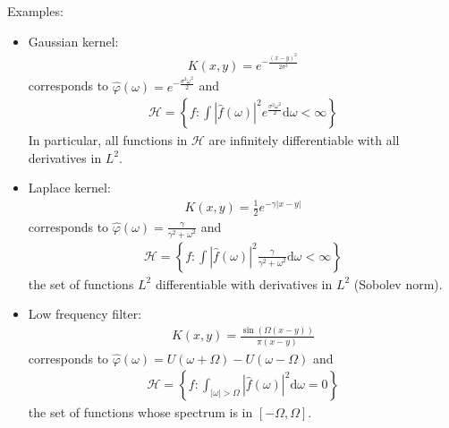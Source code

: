 \documentclass[10pt]{article}
\begin{document}
Examples:
\begin{itemize}
  \item Gaussian kernel:
  \begin{align*}
    K(x, y) = e^{-\frac{(x-y)^2}{2\sigma^2}}
  \end{align*}
  corresponds to $\hat{\varphi}(\omega) = e^{-\frac{\sigma^2\omega^2}{2}}$ and 
  \begin{align*}
    \mathcal{H}  = \left\{f: \int\left|\hat{f}(\omega)\right|^2 
    e^{\frac{\sigma^2\omega^2}{2}} \text{d}\omega < \infty \right\}
  \end{align*}
  In particular, all functions in $\mathcal{H}$ are infinitely differentiable 
  with all derivatives in $L^2$.

  \item Laplace kernel:
  \begin{align*}
    K(x, y) = \frac{1}{2}e^{-\gamma|x-y|}
  \end{align*}
  corresponds to $\hat{\varphi}(\omega) = \frac{\gamma}{\gamma^2 + \omega^2}$ 
  and 
  \begin{align*}
    \mathcal{H}  = \left\{f: \int\left|\hat{f}(\omega)\right|^2 
    \frac{\gamma}{\gamma^2 + \omega^2} \text{d}\omega < \infty \right\}
  \end{align*}
  the set of functions $L^2$ differentiable with derivatives in $L^2$ (Sobolev
  norm).

  \item Low frequency filter:
  \begin{align*}
    K(x, y) = \frac{\sin(\Omega(x-y))}{\pi(x-y)}
  \end{align*}
  corresponds to $\hat{\varphi}(\omega) = U(\omega + \Omega) - U(\omega - 
  \Omega)$ 
  and 
  \begin{align*}
    \mathcal{H}  = \left\{f: \int_{|\omega| > \Omega} \left|\hat{f}(\omega)
    \right|^2 \text{d}\omega = 0 \right\}
  \end{align*}
  the set of functions whose spectrum is in $[-\Omega, \Omega]$.
\end{itemize}
\end{document}
